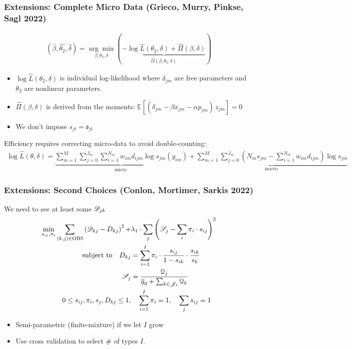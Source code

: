 \documentclass[aspectratio=169,11pt]{beamer}
\begin{document}
\begin{frame} \frametitle{Extensions: Complete Micro Data (Grieco, Murry, Pinkse, Sagl 2022)}
\footnotesize
\begin{align*}
(\hat{\beta}, \hat{\theta_2}, \hat{\delta})=\underset{\beta, \theta_2, \delta}{\arg \min }(\underbrace{-\log \hat{L}(\theta_2, \delta)+\hat{\Pi}(\beta, \delta)}_{\hat{\Omega}(\beta, \theta_2, \delta)})
\end{align*}
\begin{itemize}
\item $\log \hat{L}(\theta_2, \delta)$ is individual log-likelihood where $\delta_{jm}$ are free parameters and $\theta_2$ are nonlinear parameters.
\item $\hat{\Pi}(\beta,\delta)$ is derived from the moments: $\mathbb{E}[\left(\delta_{jm}-\beta x_{jm} - \alpha p_{jm}\right)\, z_{jm}]=0$
\item We don't impose $s_{jt} = \mathfrak{s}_{jt}$
\end{itemize}
Efficiency requires correcting micro-data to avoid double-counting:
\begin{align*}
\log \hat{L}(\theta, \delta)=\underbrace{\sum_{m=1}^M \sum_{j=0}^{J_m} \sum_{i=1}^{N_m} w_{i m} d_{i j m} \log s_{j m}(y_{i m})}_{\text {micro }}+\underbrace{\sum_{m=1}^M \sum_{j=0}^{J_m}\left(N_m s_{j m}-\sum_{i=1}^{N_m} w_{i m} d_{i j m}\right) \log s_{j m}}_{\text {macro }}
\end{align*}
\end{frame}

\begin{frame} \frametitle{Extensions: Second Choices (Conlon, Mortimer, Sarkis 2022)}
\small
We need to see at least some $\mathscr{D}_{jk}$
\begin{align*}
\min_{s_{ij}, \pi_i}\sum_{(k,j) \in \text{OBS}} \left( \calD_{kj} - D_{kj}\right)^2+ & \lambda_1 \cdot  \sum_j \left(\calS_j - \sum_i \pi_i \cdot s_{ij} \right)^2\\ %
\text{subject to} \quad 
\nonumber    D_{kj} &= \sum_{i=1}^I \pi_i \cdot \frac{s_{ij}}{1-s_{ik}} \cdot \frac{s_{ik}}{s_{k}}\\
\nonumber    \calS_j &= \frac{\mathcal{Q}_j }{\overline{q}_0 +\sum_{k \in \calJ_t} \mathcal{Q}_k}  \\
\nonumber   0\leq s_{ij}, \pi_i, s_j, D_{kj} \leq 1,& \quad
   \sum_{i=1}^I \pi_i = 1,\quad
   \sum_j s_{ij} = 1 
\end{align*}
\vspace{-.25cm}
\begin{itemize} 
  \item Semi-parametric (finite-mixture) if we let $I$ grow
\item Use cross validation to select \# of types $I$.
\end{itemize}
\end{frame}
\end{document}

